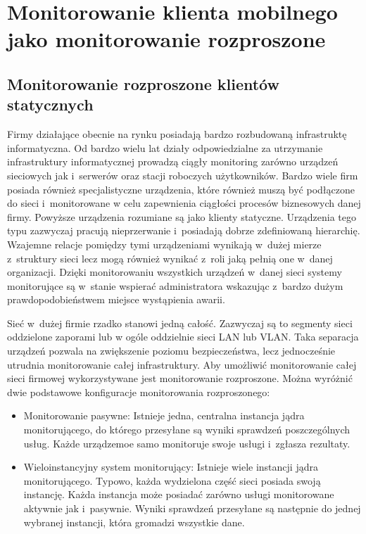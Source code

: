 \chapter{Monitorowanie klienta mobilnego jako monitorowanie rozproszone}
\label{chap:Wymagania}

\section[Monitorowanie rozproszone][Monitorowanie rozproszone klientów
statycznych]{Monitorowanie rozproszone klientów statycznych}

Firmy działające obecnie na rynku posiadają bardzo rozbudowaną
infrastruktę informatyczna. Od bardzo wielu lat działy odpowiedzialne
za utrzymanie infrastruktury informatycznej prowadzą ciągły monitoring
zarówno urządzeń sieciowych jak i~serwerów oraz stacji roboczych
użytkowników. Bardzo wiele firm posiada również specjalistyczne
urządzenia, które również muszą być podłączone do sieci i~monitorowane
w celu zapewnienia ciągłości procesów biznesowych danej
firmy. Powyższe urządzenia rozumiane są jako klienty
statyczne. Urządzenia tego typu zazwyczaj pracują nieprzerwanie
i~posiadają dobrze zdefiniowaną hierarchię. Wzajemne relacje pomiędzy
tymi urządzeniami wynikają w~dużej mierze z~struktury sieci lecz mogą
również wynikać z~roli jaką pełnią one w~danej organizacji. Dzięki
monitorowaniu wszystkich urządzeń w~danej sieci systemy monitorujące
są w~stanie wspierać administratora wskazując z~bardzo dużym
prawdopodobieństwem miejsce wystąpienia awarii.

Sieć w~dużej firmie rzadko stanowi jedną całość. Zazwyczaj są to
segmenty sieci oddzielone zaporami lub w ogóle oddzielnie sieci LAN
lub VLAN. Taka separacja urządzeń pozwala na zwiększenie poziomu
bezpieczeństwa, lecz jednocześnie utrudnia monitorowanie całej
infrastruktury. Aby umożliwić monitorowanie całej sieci firmowej
wykorzystywane jest monitorowanie rozproszone. Można wyróżnić dwie
podstawowe konfiguracje monitorowania rozproszonego:

\begin{itemize}
\item Monitorowanie pasywne: Istnieje jedna, centralna instancja jądra
  monitorującego, do którego przesyłane są wyniki sprawdzeń
  poszczególnych usług. Każde urządzemoe samo monitoruje swoje usługi
  i~zgłasza rezultaty.
\item Wieloinstancyjny system monitorujący: Istnieje wiele instancji
  jądra monitorującego. Typowo, każda wydzielona część sieci posiada
  swoją instancję. Każda instancja może posiadać zarówno usługi
  monitorowane aktywnie jak i~pasywnie. Wyniki sprawdzeń przesyłane są
  następnie do jednej wybranej instancji, która gromadzi wszystkie
  dane.
\end{itemize}


